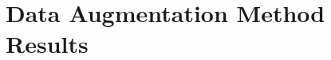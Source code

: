 \documentclass[12pt]{report}
\begin{document}
    \newpage
            

    
    
    \section{Data Augmentation Method Results}
\end{document}
